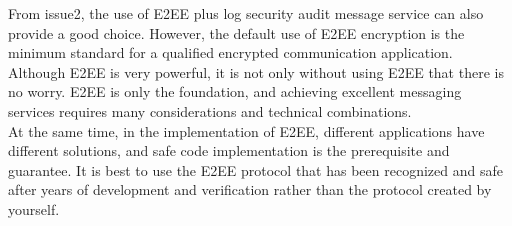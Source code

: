 \documentclass[11pt]{article}
\begin{document}
From issue2, the use of E2EE plus log security audit message service can also provide a good choice. 
However, the default use of E2EE encryption is the minimum standard for a qualified encrypted communication application.\\

Although E2EE is very powerful, it is not only without using E2EE that there is no worry. E2EE is only the foundation, and achieving excellent messaging services requires many considerations and technical combinations.\\

At the same time, in the implementation of E2EE, different applications have different solutions, and safe code implementation is the prerequisite and guarantee. It is best to use the E2EE protocol that has been recognized and safe after years of development and verification rather than the protocol created by yourself.
\end{document}

